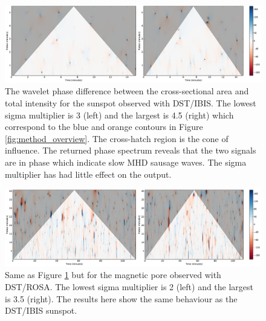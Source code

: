     \begin{figure}
    	\centering
    	\includegraphics[width=1\textwidth]{sunspot_phase.pdf}
    	\caption{
			            The wavelet phase difference between the cross-sectional area and total intensity for the sunspot observed with DST/IBIS.
			            The lowest sigma multiplier is 3 (left) and the largest is 4.5 (right) which correspond to the blue and orange contours in Figure \ref{fig:method_overview}.
			            The cross-hatch region is the cone of influence.
						The returned phase spectrum reveals that the two signals are in phase which indicate slow MHD sausage waves.
						The sigma multiplier has had little effect on the output.
    	             }
    	\label{fig:phase_sunspot}
    \end{figure}
 
    \begin{figure}
     	\centering
     	\includegraphics[width=1\textwidth]{pore_phase.pdf}
     	\caption{
	             		Same as Figure \ref{fig:phase_sunspot} but for the magnetic pore observed with DST/ROSA.
	             		The lowest sigma multiplier is 2 (left) and the largest is 3.5 (right).
	             		The results here show the same behaviour as the DST/IBIS sunspot.
     		          }
     	\label{fig:phase_pore}
    \end{figure}